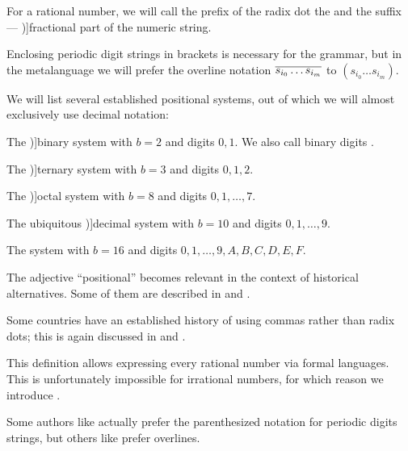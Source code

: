 \begin{definition}
  For a rational number, we will call the prefix of the radix dot the  and the suffix --- \term[en=fractional part (\cite[214]{Knuth1997ArtVol2})]{fractional part} of the numeric string.

  Enclosing periodic digit strings in brackets is necessary for the grammar, but in the metalanguage we will prefer the overline notation \( \oline{s_{i_0} \ldots s_{i_m}} \) to \( (s_{i_0} \ldots s_{i_m}) \).

  We will list several established positional systems, out of which we will almost exclusively use decimal notation:
  \begin{thmenum}
     The \term[ru=двоичная (система) (\cite[60]{Зорич2019АнализТом1})]{binary} system with \( b = 2 \) and digits \( 0, 1 \). We also call binary digits .

    \mimprovised The \term[ru=троичная (система) (\cite[60]{Зорич2019АнализТом1})]{ternary} system with \( b = 3 \) and digits \( 0, 1, 2 \).

     The \term[ru=восьмичная (система) (\cite[60]{Зорич2019АнализТом1})]{octal} system with \( b = 8 \) and digits \( 0, 1, \ldots, 7 \).

     The ubiquitous \term[ru=десетичная (система) (\cite[60]{Зорич2019АнализТом1})]{decimal} system with \( b = 10 \) and digits \( 0, 1, \ldots, 9 \).

     The  system with \( b = 16 \) and digits \( 0, 1, \ldots, 9, A, B, C, D, E, F \).
  \end{thmenum}
\end{definition}
\begin{comments}
  \item The adjective \enquote{positional} becomes relevant in the context of historical alternatives. Some of them are described in \cite[ch. 1]{АлександровМаркушевичХинчинЭнциклопедия1951Том1} and \cite[sec. 4.1]{Knuth1997ArtVol2}.

  \item Some countries have an established history of using commas rather than radix dots; this is again discussed in \cite[ch. 1]{АлександровМаркушевичХинчинЭнциклопедия1951Том1} and \cite[sec. 4.1]{Knuth1997ArtVol2}.

  \item This definition allows expressing every rational number via formal languages. This is unfortunately impossible for irrational numbers, for which reason we introduce .

  \item Some authors like  actually prefer the parenthesized notation for periodic digits strings, but others like  prefer overlines.
\end{comments}

